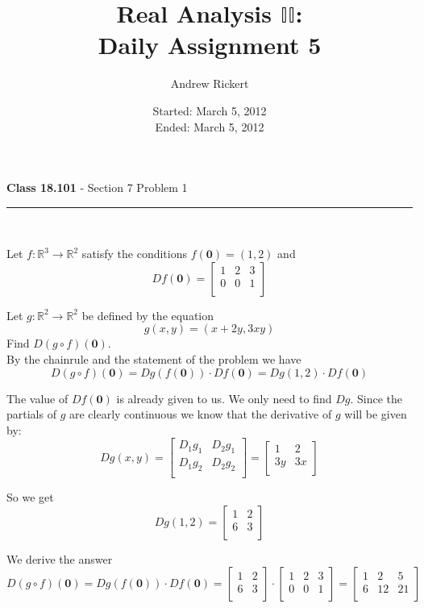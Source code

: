 \documentclass[11pt,reqno]{article}
\title{Real Analysis $\mathbb{II}$: \\ Daily Assignment 5}
\author{Andrew Rickert}
\date{Started: March 5, 2012 \\ \hspace{1pt} Ended: March 5,  2012}                                           %
\begin{document}
\maketitle

\begin{flushleft} 
\textbf{Class 18.101} - Section 7 Problem 1\\
\rule{500pt}{1pt}\\
\end{flushleft} 

\noindent Let $f : \mathbb{R}^3 \to \mathbb{R}^2$ satisfy the conditions $f(\textbf{0}) = (1,2)$ and 
\[ D f(\textbf{0}) = \left[ \begin{array}{ccc}
1 & 2 & 3 \\
0 & 0 & 1\\
\end{array} \right] \]

\noindent Let $g : \mathbb{R}^2 \to \mathbb{R}^2$ be defined by the equation
\[ g(x,y) = (x + 2 y, 3 x y) \]
\noindent Find $D(g \circ f)(\textbf{0})$.\\

\noindent By the chainrule and the statement of the problem we have 
\[ D(g \circ f)(\textbf{0})  =  D g(f(\textbf{0})) \cdot D f(\textbf{0}) =  D g(1,2) \cdot D f(\textbf{0}) \]

The value of $D f(\textbf{0})$ is already given to us. We only need to find $D g$. Since the partials of $g$ are clearly continuous we know that the derivative of $g$ will be given by:
\[ D g(x,y) = \left[ \begin{array}{cc}
D_1 g_1 & D_2 g_1 \\
D_1 g_2 & D_2 g_2 \\
\end{array} \right]  = \left[ \begin{array}{cc}
1 & 2 \\
3 y & 3 x \\
\end{array} \right] \]

\noindent So we get 
\[ D g(1,2) =  \left[ \begin{array}{cc}
1 & 2 \\
6 & 3 \\
\end{array} \right] \]

\noindent We derive the answer
\[ D(g \circ f)(\textbf{0})  = D g(f(\textbf{0})) \cdot D f(\textbf{0})  = \left[ \begin{array}{cc}
1 & 2 \\
6 & 3 \\
\end{array} \right] \cdot \left[ \begin{array}{ccc}
1 & 2 & 3 \\
0 & 0 & 1\\
\end{array} \right] = \left[ \begin{array}{ccc}
1 & 2 & 5 \\
6 & 12 & 21\\
\end{array} \right]\] 
\newpage
\end{document}
